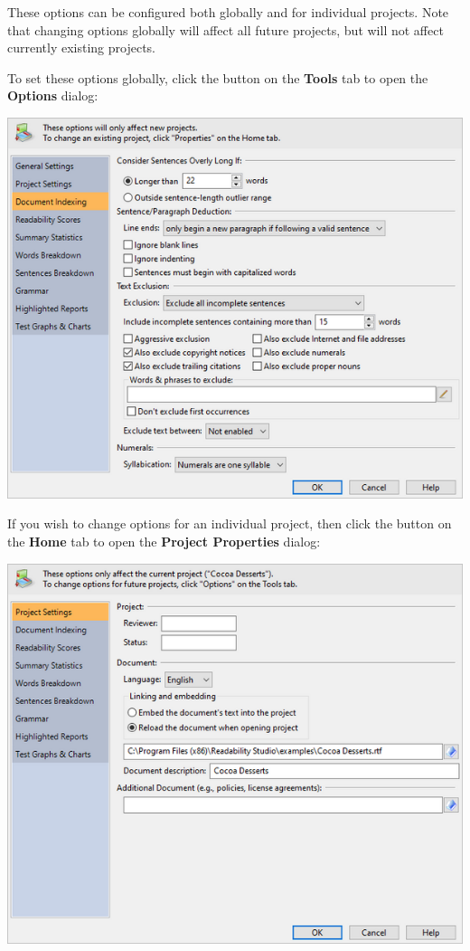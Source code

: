 \documentclass[
]{book}
\theoremstyle{definition}
\theoremstyle{definition}
\theoremstyle{definition}
\theoremstyle{definition}
\theoremstyle{remark}
\begin{document}
These options can be configured both globally and for individual projects. Note that changing options globally will affect all future projects, but will not affect currently existing projects.

To set these options globally, click the  button on the \textbf{Tools} tab to open the \textbf{Options} dialog:

\includegraphics{Images/OptionsDlg.png}

If you wish to change options for an individual project, then click the  button on the \textbf{Home} tab to open the \textbf{Project Properties} dialog:

\includegraphics{Images/linktofile.png}
\end{document}
